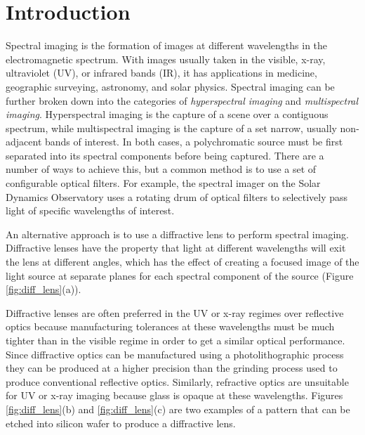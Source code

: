 \documentclass{article}
\begin{document}
\section{Introduction}
\label{sec:intro}
Spectral imaging is the formation of images at different wavelengths in the
electromagnetic spectrum.  With images usually taken in the visible, x-ray,
ultraviolet (UV), or infrared bands (IR), it has applications in medicine, geographic
surveying, astronomy, and solar physics.  Spectral imaging can be further broken
down into the categories of \emph{hyperspectral imaging} and \emph{multispectral imaging}.
Hyperspectral imaging is the capture of a scene over a contiguous spectrum,
while multispectral imaging is the capture of a set narrow, usually non-adjacent
bands of interest.  In both cases, a polychromatic source must be first
separated into its spectral components before being captured.  There are a
number of ways to achieve this, but a common method is to use a set of
configurable optical filters.  For example, the spectral imager on the Solar
Dynamics Observatory uses a rotating drum of optical filters to selectively pass
light of specific wavelengths of interest.


An alternative approach is to use a diffractive lens to perform spectral
imaging.  Diffractive lenses have the property that light at different
wavelengths will exit the lens at different angles, which has the effect of
creating a focused image of the light source at separate planes for each
spectral component of the source (Figure \ref{fig:diff_lens}(a)).

Diffractive lenses are often preferred in the UV or x-ray regimes over
reflective optics because manufacturing tolerances at these wavelengths must be
much tighter than in the visible regime in order to get a similar optical
performance.  Since diffractive optics can be manufactured using a
photolithographic process they can be produced at a higher precision than
the grinding process used to produce conventional reflective optics.
Similarly, refractive optics are unsuitable for UV or x-ray imaging because
glass is opaque at these wavelengths. Figures \ref{fig:diff_lens}(b) and
\ref{fig:diff_lens}(c) are two examples of a pattern that can be etched into
silicon wafer to produce a diffractive lens.
\end{document}
